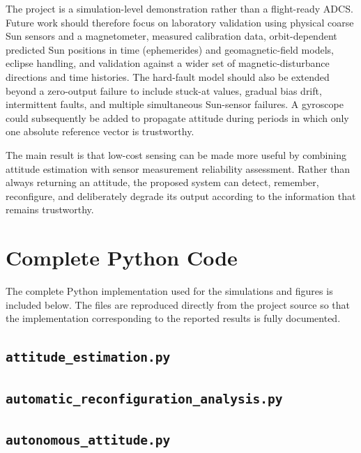 \documentclass[11pt,a4paper]{article}
\begin{document}
The project is a simulation-level demonstration rather than a flight-ready ADCS. Future work should therefore focus on laboratory validation using physical coarse Sun sensors and a magnetometer, measured calibration data, orbit-dependent predicted Sun positions in time (ephemerides) and geomagnetic-field models, eclipse handling, and validation against a wider set of magnetic-disturbance directions and time histories. The hard-fault model should also be extended beyond a zero-output failure to include stuck-at values, gradual bias drift, intermittent faults, and multiple simultaneous Sun-sensor failures. A gyroscope could subsequently be added to propagate attitude during periods in which only one absolute reference vector is trustworthy.

The main result is that low-cost sensing can be made more useful by combining attitude estimation with sensor measurement reliability assessment. Rather than always returning an attitude, the proposed system can detect, remember, reconfigure, and deliberately degrade its output according to the information that remains trustworthy.

\clearpage




\clearpage
\appendix
\section{Complete Python Code}
\label{app:code}

The complete Python implementation used for the simulations and figures is included below. The files are reproduced directly from the project source so that the implementation corresponding to the reported results is fully documented.

\subsection{\texttt{attitude\_estimation.py}}


\subsection{\texttt{automatic\_reconfiguration\_analysis.py}}


\subsection{\texttt{autonomous\_attitude.py}}

\end{document}
